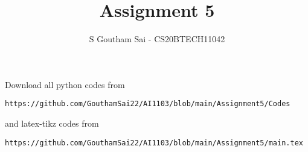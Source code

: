 \documentclass[journal,12pt,twocolumn]{IEEEtran}
\DeclareMathOperator*{\Res}{Res}
\begin{document}
\newcommand{\BEQA}{\begin{eqnarray}}
\newcommand{\EEQA}{\end{eqnarray}}
\newcommand{\define}{\stackrel{\triangle}{=}}

\raggedbottom
\setlength{\parindent}{0pt}
\providecommand{\mbf}{\mathbf}
\providecommand{\pr}[1]{\ensuremath{\Pr\left(#1\right)}}
\providecommand{\qfunc}[1]{\ensuremath{Q\left(#1\right)}}
\providecommand{\sbrak}[1]{\ensuremath{{}\left[#1\right]}}
\providecommand{\lsbrak}[1]{\ensuremath{{}\left[#1\right.}}
\providecommand{\rsbrak}[1]{\ensuremath{{}\left.#1\right]}}
\providecommand{\brak}[1]{\ensuremath{\left(#1\right)}}
\providecommand{\lbrak}[1]{\ensuremath{\left(#1\right.}}
\providecommand{\rbrak}[1]{\ensuremath{\left.#1\right)}}
\providecommand{\cbrak}[1]{\ensuremath{\left\{#1\right\}}}
\providecommand{\lcbrak}[1]{\ensuremath{\left\{#1\right.}}
\providecommand{\rcbrak}[1]{\ensuremath{\left.#1\right\}}}
\theoremstyle{remark}
\newtheorem{rem}{Remark}
\newcommand{\sgn}{\mathop{\mathrm{sgn}}}
\providecommand{\abs}[1]{\vert#1\vert}
\providecommand{\res}[1]{\Res\displaylimits_{#1}} 
\providecommand{\norm}[1]{\lVert#1\rVert}
\providecommand{\mtx}[1]{\mathbf{#1}}
\providecommand{\mean}[1]{E[ #1 ]}
\providecommand{\fourier}{\overset{\mathcal{F}}{ \rightleftharpoons}}
\providecommand{\system}{\overset{\mathcal{H}}{ \longleftrightarrow}}
\newcommand{\solution}{\noindent \textbf{Solution: }}
\newcommand{\cosec}{\,\text{cosec}\,}
\providecommand{\dec}[2]{\ensuremath{\overset{#1}{\underset{#2}{\gtrless}}}}
\newcommand{\myvec}[1]{\ensuremath{\begin{pmatrix}#1\end{pmatrix}}}
\newcommand{\mydet}[1]{\ensuremath{\begin{vmatrix}#1\end{vmatrix}}}
\makeatletter
{}
\makeatother
\let\StandardTheFigure\thefigure
\let\vec\mathbf
\renewcommand{\thefigure}{\theproblem}
\def\putbox#1#2#3{\makebox[0in][l]{\makebox[#1][l]{}\raisebox{\baselineskip}[0in][0in]{\raisebox{#2}[0in][0in]{#3}}}}
     \def\rightbox#1{\makebox[0in][r]{#1}}
     \def\centbox#1{\makebox[0in]{#1}}
     \def\topbox#1{\raisebox{-\baselineskip}[0in][0in]{#1}}
     \def\midbox#1{\raisebox{-0.5\baselineskip}[0in][0in]{#1}}
\vspace{3cm}
\title{Assignment 5}
\author{S Goutham Sai - CS20BTECH11042}
\maketitle
\newpage
\bigskip
\renewcommand{\thefigure}{\theenumi}
\renewcommand{\thetable}{\theenumi}
Download all python codes from 
\begin{lstlisting}
https://github.com/GouthamSai22/AI1103/blob/main/Assignment5/Codes
\end{lstlisting}
%
and latex-tikz codes from 
%
\begin{lstlisting}
https://github.com/GouthamSai22/AI1103/blob/main/Assignment5/main.tex
\end{lstlisting}
\end{document}
